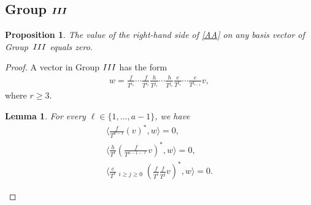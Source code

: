 \documentclass[11pt]{article}
\numberwithin{equation}{section}
\newtheorem{lem}[thm]{Lemma}
\newtheorem{prop}[thm]{Proposition}
{\theoremstyle{definition}
\newtheorem*{rem}{Remark}}
\begin{document}
\subsection[Group ${\rm III}$]{Group $\boldsymbol{{\rm III}}$}
\begin{prop}\label{Pr1}The value of the right-hand side of \eqref{AA} on any basis vector of Group~${\rm III}$ equals zero.
\end{prop}
\begin{proof}A vector in Group ${\rm III}$ has the form
\begin{gather*}
w= \frac{f}{T^{i_1}}\cdots\frac{f}{T^{i_r}}
\frac{h}{T^{j_1}}\cdots\frac{h}{T^{j_s}}
\frac{e}{T^{l_1}}\cdots\frac{e}{T^{l_{r-1}}}v,
\end{gather*}
where $r \geq 3$.

\begin{lem}\label{Group 1}For every $\ell \in \{1, \dots, a-1 \}$, we have
\begin{gather}
\bigg\langle \frac{f}{T^{a-1}} (v)^*, w \bigg\rangle =0, \label{G31} \\
\bigg\langle \frac{h}{T^{\ell}} \left(\frac{f}{T^{a-1-\ell}}v\right)^*, w \bigg\rangle =0, \label{G32} \\
 \bigg\langle \frac{e}{T^{\ell}} \mathop{\sum_{i+j=a-1-\ell}}_{i\geq j\geq 0} \left(\frac{f}{T^i}\frac{f}{T^j}v\right)^*, w \bigg\rangle = 0. \label{G33}
\end{gather}
\end{lem}


\end{proof}
\end{document}
